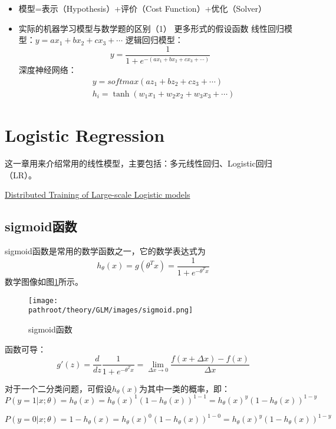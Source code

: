 \documentclass[10pt,a4paper]{ctexbook}
\providecommand{\pathroot}{../..}
\begin{document}
\begin{itemize}
\item 模型=表示（Hypothesis）+评价（Cost Function）+优化（Solver）
\item 实际的机器学习模型与数学题的区别（1）
\subitem 更多形式的假设函数
\subsubitem 线性回归模型：$y=ax_{1}+bx_{2}+cx_{3}+\cdots$
\subsubitem 逻辑回归模型：
\[
y=\frac{1}{1 + e^{-(ax_{1}+bx_{2}+cx_{3}+\cdots)}}
\]
\subsubitem 深度神经网络：
\begin{align*}
&y=softmax{(az_{1}+bz_{2}+cz_{3}+\cdots)} \\
&h_{i}=\tanh{(w_{1}x_{1}+w_{2}x_{2}+w_{3}x_{3}+\cdots)}
\end{align*}
\end{itemize}

\section{Logistic Regression}
这一章用来介绍常用的线性模型，主要包括：多元线性回归、Logistic回归（LR）。

\href{http://www.cs.cmu.edu/~sgopal1/papers/ICML13.pdf}{Distributed Training of Large-scale Logistic models}

\subsection{sigmoid函数}
sigmoid函数是常用的数学函数之一，它的数学表达式为
\[
    h_{\theta}(x)=g({\theta}^Tx)={\frac {1}{1+e^{-\theta^Tx}}}
\]
数学图像如图\ref{fig:sigmoid}所示。

\begin{figure}[ht]
    \centering
    \texttt{[image: \\pathroot/theory/GLM/images/sigmoid.png]}
    \caption{sigmoid函数}
    \label{fig:sigmoid}
\end{figure}

函数可导：
\[
g'(z)={\frac {d}{dz}}{\frac {1}{1+e^{-\theta^Tx}}}=\lim_{{\Delta x}\to 0}{\frac {f(x+{\Delta x})-f(x)}{\Delta x}}
\]

对于一个二分类问题，可假设$h_{\theta}(x)$为其中一类的概率，即：
\[
P(y=1|x;\theta)=h_{\theta}(x)
               =h_{\theta}(x)^{1}(1-h_{\theta}(x))^{1-1}
               =h_{\theta}(x)^{y}(1-h_{\theta}(x))^{1-y}
\]

\[
P(y=0|x;\theta)=1-h_{\theta}(x)
               =h_{\theta}(x)^{0}(1-h_{\theta}(x))^{1-0}
               =h_{\theta}(x)^{y}(1-h_{\theta}(x))^{1-y}
\]
\end{document}

